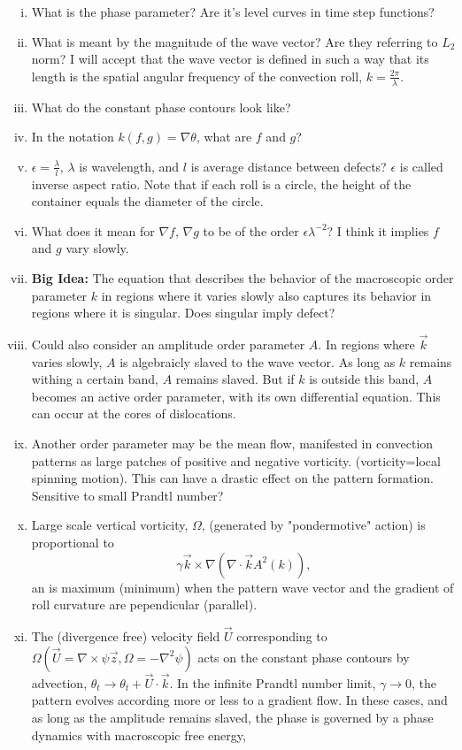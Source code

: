 \documentclass[12pt]{article}
\begin{document}
\begin{enumerate}[(i)]
    \item What is the phase parameter? Are it's level curves in time step functions?
    \item What is meant by the magnitude of the wave vector? Are they referring to $L_2$ norm? I will accept that the wave vector is defined in such a way that its length is the spatial angular frequency of the convection roll, $k=\frac{2\pi}{\lambda}$.
   \item What do the constant phase contours look like?
    \item In the notation $k(f,g)=\nabla \theta$, what are $f$ and $g$?
\item $\epsilon = \frac{\lambda}{l}$, $\lambda$ is wavelength, and $l$ is average distance between defects? $\epsilon$ is called inverse aspect ratio. Note that if each roll is a circle, the height of the container equals the diameter of the circle.
\item What does it mean for $\nabla f$, $\nabla g$ to be of the order $\epsilon \lambda^{-2}$? I think it implies $f$ and $g$ vary slowly.
\item \textbf{Big Idea:} The equation that describes the behavior of the macroscopic order parameter $k$ in regions where it varies slowly also captures its behavior in regions where it is singular. Does singular imply defect?
\item Could also consider an amplitude order parameter $A$. In regions where $\vec{k}$ varies slowly, $A$ is algebraicly slaved to the wave vector. As long as $k$ remains withing a certain band, $A$ remains slaved. But if $k$ is outside this band, $A$ becomes an active order parameter, with its own differential equation. This can occur at the cores of dislocations. 
\item Another order parameter may be the mean flow, manifested in convection patterns as large patches of positive and negative vorticity. (vorticity=local spinning motion). This can have a drastic effect on the pattern formation. Sensitive to small Prandtl number?
\item Large scale vertical vorticity, $\Omega$, (generated by "pondermotive" action) is proportional to 
    \[
        \gamma \vec{k}\times\nabla(\nabla \cdot \vec{k}A^2(k)),
    \] 
    an is maximum (minimum) when the pattern wave vector and the gradient of roll curvature are pependicular (parallel).
\item The (divergence free) velocity field $\vec{U}$ corresponding to $\Omega(\vec{U}=\nabla\times\psi \vec{z}, \Omega=-\nabla^2\psi)$ acts on the constant phase contours by advection, $\theta_t \rightarrow \theta_t + \vec{U}\cdot\vec{k}$. In the infinite Prandtl number limit, $\gamma \rightarrow 0$, the pattern evolves according more or less to a gradient flow. In these cases, and as long as the amplitude remains slaved, the phase is governed by a phase dynamics with macroscopic free energy,

\end{enumerate}
\end{document}
